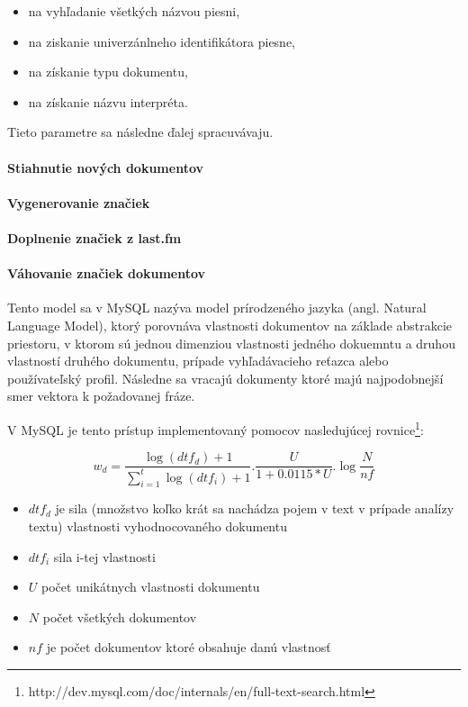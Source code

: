 \begin{itemize}
\item{ na vyhľadanie všetkých názvou piesni,}
\item{ na ziskanie univerzánlneho identifikátora piesne,}
\item{ na získanie typu dokumentu,}
\item{ na získanie názvu interpréta.}
\end{itemize}

Tieto parametre sa následne ďalej spracuvávaju.

\paragraph{Stiahnutie nových dokumentov}

\paragraph{Vygenerovanie značiek}

\paragraph{Doplnenie značiek z last.fm}

\paragraph{Váhovanie značiek dokumentov}

Tento model sa v MySQL nazýva model prírodzeného jazyka (angl. Natural Language Model),
ktorý porovnáva vlastnosti dokumentov na základe abstrakcie priestoru,
v ktorom sú jednou dimenziou vlastnosti jedného dokuemntu a druhou vlastností druhého
dokumentu, prípade vyhľadávacieho reťazca alebo používateľský profil.
Následne sa vracajú dokumenty ktoré majú najpodobnejší smer vektora k požadovanej fráze.

V MySQL je tento prístup implementovaný pomocov nasledujúcej rovnice\footnote[1]{http://dev.mysql.com/doc/internals/en/full-text-search.html}:

\[
    w_d = \frac{\log(dtf_d) + 1}{\sum_{i=1}^{t} \log (dtf_i) + 1} .
        \frac{U}{1+0.0115 * U} .
        \log \frac {N}{nf}
\]

\begin{itemize}
\item{\(dtf_d\) je sila (množstvo koľko krát sa nachádza pojem v text v prípade analízy textu)
    vlastnosti vyhodnocovaného dokumentu}
\item{\(dtf_i\) sila i-tej vlastnosti}
\item{\(U\) počet unikátnych vlastnosti dokumentu}
\item{\(N\) počet všetkých dokumentov}
\item{\(nf\) je počet dokumentov ktoré obsahuje danú vlastnosť}
\end{itemize}

